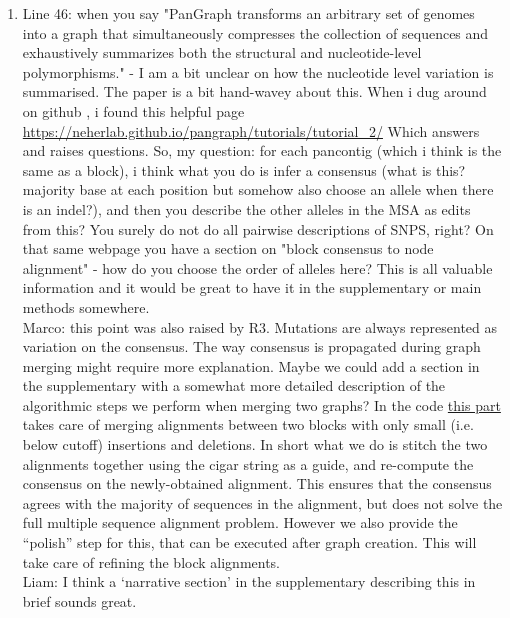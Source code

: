 \documentclass[aps,rmp,onecolumn]{revtex4-1}
\newcommand{\Marco}[1]{{\color{gray}Marco: #1}}
\newcommand{\Liam}[1]{{\color{teal}Liam: #1}}
\begin{document}
\begin{enumerate}
      \item Line 46: when you say "PanGraph transforms an arbitrary set of genomes into a graph that simultaneously compresses the collection of sequences and exhaustively summarizes both the structural and nucleotide-level polymorphisms." - I am a bit unclear on how the nucleotide level variation is summarised. The paper is a bit hand-wavey about this. When i dug around on github , i found this helpful page \url{https://neherlab.github.io/pangraph/tutorials/tutorial_2/} Which answers and raises questions. So, my question: for each pancontig (which i think is the same as a block), i think what you do is infer a consensus (what is this? majority base at each position but somehow also choose an allele when there is an indel?), and then you describe the other alleles in the MSA as edits from this? You surely do not do all pairwise descriptions of SNPS, right? On that same webpage you have a section on "block consensus to node alignment" - how do you choose the order of alleles here? This is all valuable information and it would be great to have it in the supplementary or main methods somewhere.\\
            \Marco{this point was also raised by R3. Mutations are always represented as variation on the consensus. The way consensus is propagated during graph merging might require more explanation. Maybe we could add a section in the supplementary with a somewhat more detailed description of the algorithmic steps we perform when merging two graphs? In the code \href{https://github.com/neherlab/pangraph/blob/e1c11012a3d19975d4b1dc61b1af3eb3949f7cd2/src/block.jl\#L1274}{this part} takes care of merging alignments between two blocks with only small (i.e. below cutoff) insertions and deletions. In short what we do is stitch the two alignments together using the cigar string as a guide, and re-compute the consensus on the newly-obtained alignment. This ensures that the consensus agrees with the majority of sequences in the alignment, but does not solve the full multiple sequence alignment problem. However we also provide the ``polish'' step for this, that can be executed after graph creation. This will take care of refining the block alignments.}\\
            \Liam{I think a `narrative section' in the supplementary describing this in brief sounds great.}


\end{enumerate}
\end{document}
